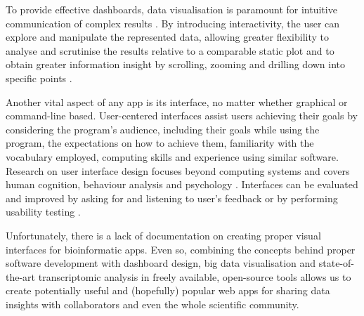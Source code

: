 To provide effective dashboards, data visualisation is paramount for intuitive communication of complex results \cite{tidwell:2019tf}. By introducing interactivity, the user can explore and manipulate the represented data, allowing greater flexibility to analyse and scrutinise the results relative to a comparable static plot and to obtain greater information insight by scrolling, zooming and drilling down into specific points \cite{tidwell:2019tf}.

Another vital aspect of any app is its interface, no matter whether graphical or command-line based. User-centered interfaces assist users achieving their goals by considering the program's audience, including their goals while using the program, the expectations on how to achieve them, familiarity with the vocabulary employed, computing skills and experience using similar software. Research on user interface design focuses beyond computing systems and covers human cognition, behaviour analysis and psychology \cite{silva:2017wl,hewitt:2019uj,tidwell:2019tf,alves:2020vu}. Interfaces can be evaluated and improved by asking for and listening to user's feedback or by performing usability testing \cite{tidwell:2019tf}.

Unfortunately, there is a lack of documentation on creating proper visual interfaces for bioinformatic apps. Even so, combining the concepts behind proper software development with dashboard design, big data visualisation and state-of-the-art transcriptomic analysis in freely available, open-source tools allows us to create potentially useful and (hopefully) popular web apps for sharing data insights with collaborators and even the whole scientific community.
